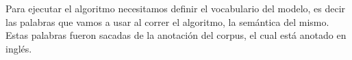 Para ejecutar el algoritmo necesitamos definir el vocabulario del modelo, es decir las palabras que vamos a usar al correr el algoritmo, la sem\'antica del mismo. Estas palabras fueron sacadas de la anotaci\'on del corpus, el cual est\'a anotado en ingl\'es.\\


